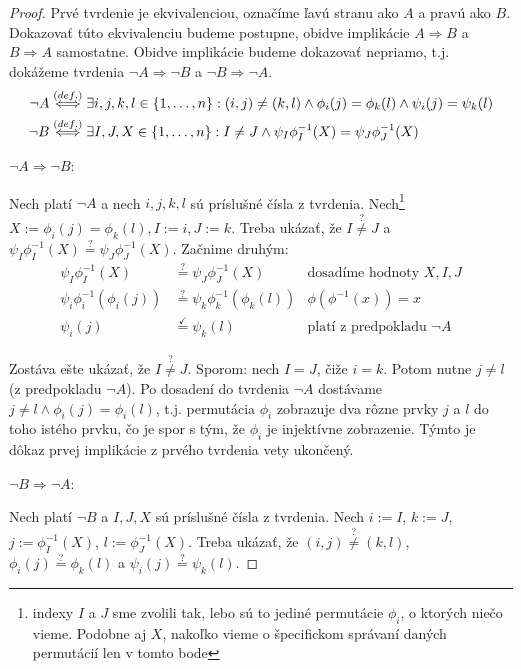 \begin{toreview}
\begin{proof}
Prvé tvrdenie je ekvivalenciou, označíme ľavú stranu ako $A$ a pravú ako $B$. 
Dokazovať túto ekvivalenciu budeme postupne, obidve implikácie $A \Longrightarrow B$ a $B \Longrightarrow A$ samostatne.
Obidve implikácie budeme dokazovať nepriamo, t.j. dokážeme tvrdenia $\neg A \Longrightarrow \neg B$ a $\neg B \Longrightarrow \neg A$.
\begin{align*}
\neg A &\overset{(def.)}{\Longleftrightarrow} \exists i, j, k, l \in \left\{1, \ldots, n\right\}: (i, j) \neq (k, l) \wedge \phi_i(j) = \phi_k(l) \wedge \psi_i(j) = \psi_k(l)\\
\neg B &\overset{(def.)}{\Longleftrightarrow} \exists I, J, X \in \left\{1, \ldots, n\right\}: I \neq J \wedge \psi_I\phi_I^{-1}(X) = \psi_J \phi_J^{-1}(X)    
\end{align*}

\noindent$\neg A \Longrightarrow \neg B$:

Nech platí $\neg A$ a nech $i,j,k,l$ sú príslušné čísla z tvrdenia.
Nech\footnote{indexy $I$ a $J$ sme zvolili tak, lebo sú to jediné permutácie $\phi_i$, o ktorých niečo vieme. Podobne aj $X$, nakoľko vieme o špecifickom správaní daných permutácií len v tomto bode} $X := \phi_i(j) = \phi_k(l), I := i, J := k$.
Treba ukázať, že $I \overset{?}{\neq} J$ a $\psi_I\phi_I^{-1}(X) \overset{?}{=} \psi_J \phi_J^{-1}(X)$.
Začnime druhým:
\begin{align*}
\psi_I\phi_I^{-1}(X) &\overset{?}{=} \psi_J \phi_J^{-1}(X) &\text{dosadíme hodnoty $X, I, J$}\\
\psi_i \phi_i^{-1}(\phi_i(j)) &\overset{?}{=} \psi_k \phi_k^{-1}(\phi_k(l)) &\text{$\phi(\phi^{-1}(x)) = x$}\\
\psi_i(j) &\overset{\checkmark}{=} \psi_k(l) &\text{platí z predpokladu $\neg A$}
\end{align*}

Zostáva ešte ukázať, že $I \overset{?}{\neq} J$. Sporom: nech $I = J$, čiže $i = k$. 
Potom nutne $j \neq l$ (z predpokladu $\neg A$).
Po dosadení do tvrdenia $\neg A$ dostávame $j \neq l \wedge \phi_i(j) = \phi_i(l)$, t.j. permutácia $\phi_i$ zobrazuje dva rôzne prvky $j$ a $l$ do toho istého prvku, čo je spor s tým, že $\phi_i$ je injektívne zobrazenie.
Týmto je dôkaz prvej implikácie z prvého tvrdenia vety ukončený.

\noindent$\neg B \Longrightarrow \neg A$:

Nech platí $\neg B$ a $I, J, X$ sú príslušné čísla z tvrdenia.
Nech $i := I$, $k := J$, $j := \phi_I^{-1}(X)$, $l := \phi_J^{-1}(X)$.
Treba ukázať, že $(i, j) \overset{?}{\neq} (k, l)$, $\phi_i(j) \overset{?}{=} \phi_k(l)$ a $\psi_i(j) \overset{?}{=} \psi_k(l)$.


\end{proof}
\end{toreview}
